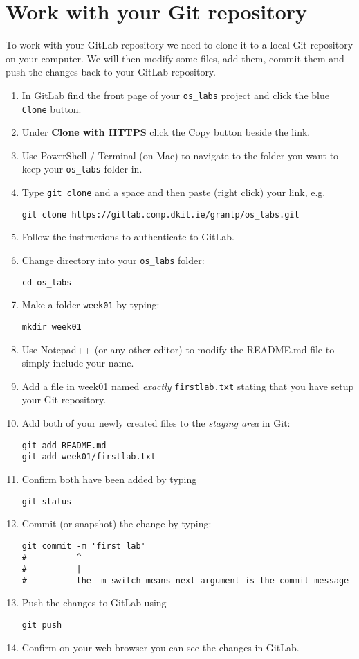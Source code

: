 \section{Work with your Git repository}

To work with your GitLab repository we need to clone it to a local Git repository on your computer.
We will then modify some files, add them, commit them and push the changes back to your GitLab repository. 

\begin{enumerate}
\item In GitLab find the front page of your \texttt{os\_labs} project and click the blue \texttt{Clone} button.
\item Under \textbf{Clone with HTTPS} click the Copy button beside the link. 
\item Use PowerShell / Terminal (on Mac) to navigate to the folder you want to keep your \texttt{os_labs} folder in.
\item Type \texttt{git clone} and a space and then paste (right click) your link, e.g.
\begin{verbatim}
git clone https://gitlab.comp.dkit.ie/grantp/os_labs.git
\end{verbatim}
\item Follow the instructions to authenticate to GitLab.
\item Change directory into your \texttt{os\_labs} folder:
\begin{verbatim}
cd os_labs
\end{verbatim}
\item Make a folder \texttt{week01} by typing:
\begin{verbatim}
mkdir week01
\end{verbatim}
\item Use Notepad++ (or any other editor) to modify the README.md file to simply include your name.
\item Add a file in week01 named \textit{exactly} \texttt{firstlab.txt} stating that you have setup your Git repository.
\item Add both of your newly created files to the \textit{staging area} in Git:
\begin{verbatim}
git add README.md
git add week01/firstlab.txt
\end{verbatim}
\item Confirm both have been added by typing
\begin{verbatim}
git status
\end{verbatim}
\item Commit (or snapshot) the change by typing:
\begin{verbatim}
git commit -m 'first lab'
#          ^
#          |
#          the -m switch means next argument is the commit message
\end{verbatim}
\item Push the changes to GitLab using
\begin{verbatim}
git push
\end{verbatim}
\item Confirm on your web browser you can see the changes in GitLab.

\end{enumerate}

